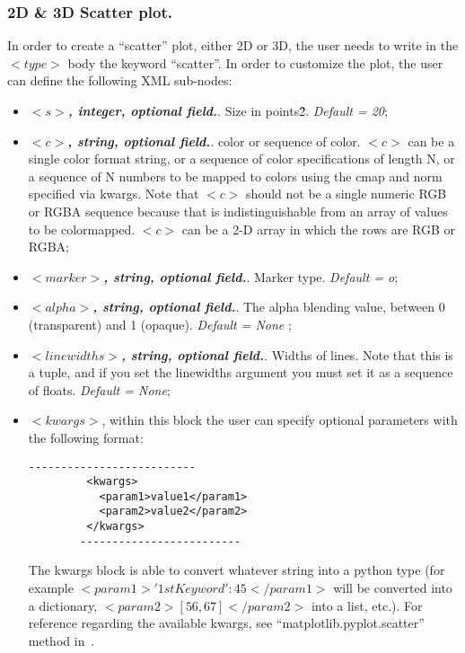 \subsubsection{2D \& 3D Scatter plot.}
In order to create a ``scatter'' plot, either 2D or 3D, the user needs to write in the $<type>$ body the keyword ``scatter''. In order to customize the plot, the user can define the following XML sub-nodes:
  \begin{itemize}
     \item $<s>$\textbf{\textit{, integer, optional  field.}}. Size in points\^2. \textit{Default = 20};
     \item $<c>$\textbf{\textit{, string, optional  field.}}. color or sequence of color. $<c>$ can be a single color format string, or a sequence of color specifications of length N, or a sequence of N numbers to be mapped to colors using the cmap and norm specified via kwargs. Note that $<c>$ should not be a single numeric RGB or RGBA sequence because that is indistinguishable from an array of values to be colormapped. $<c>$ can be a 2-D array in which the rows are RGB or RGBA;
     \item $<marker>$\textbf{\textit{, string, optional  field.}}. Marker type. \textit{Default = o};  
     \item $<alpha>$\textbf{\textit{, string, optional  field.}}. The alpha blending value, between 0 (transparent) and 1 (opaque). \textit{Default = None} ;
     \item $<linewidths>$\textbf{\textit{, string, optional  field.}}. Widths of lines.  Note that this is a tuple, and if you set the linewidths argument you must set it as a sequence of floats. \textit{Default = None};
     \item \textit{$<kwargs>$},  within this block the user can specify optional parameters with the following format:
        \begin{lstlisting}[style=XML]
        --------------------------
         <kwargs>
           <param1>value1</param1>
           <param2>value2</param2>
         </kwargs>
        -------------------------
       \end{lstlisting}
         The kwargs block is able to convert whatever string into a python type (for example $<param1>{'1stKeyword':45}</param1>$ will be converted into a dictionary, $<param2>[56,67]</param2>$ into a list, etc.). For reference regarding the available kwargs, see ``matplotlib.pyplot.scatter'' method in~\cite{MatPlotLib}.
    \end{itemize}

